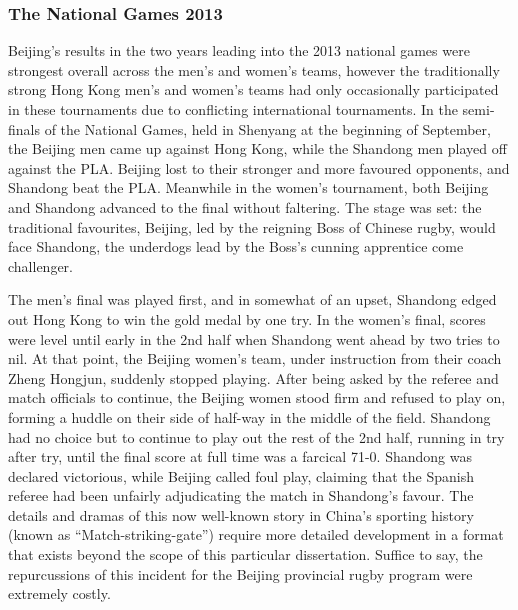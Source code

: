 {\subsubsection{The National Games 2013}
Beijing's results in the two years leading into the 2013 national games were strongest overall across the men's and women's teams, however the traditionally strong Hong Kong men's and women's teams had only occasionally participated in these tournaments due to conflicting international tournaments.  In the semi-finals of the National Games, held in Shenyang at the beginning of September, the Beijing men came up against Hong Kong, while the Shandong men played off against the PLA.  Beijing lost to their stronger and more favoured opponents, and Shandong beat the PLA.  Meanwhile in the women's tournament, both Beijing and Shandong advanced to the final without faltering.  The stage was set: the traditional favourites, Beijing, led by the reigning Boss of Chinese rugby, would face Shandong, the underdogs lead by the Boss's cunning apprentice come challenger.

The men's final was played first, and in somewhat of an upset, Shandong edged out Hong Kong to win the gold medal by one try.  In the women's final, scores were level until early in the 2nd half when Shandong went ahead by two tries to nil.  At that point, the Beijing women's team, under instruction from their coach Zheng Hongjun, suddenly stopped playing.  After being asked by the referee and match officials to continue, the Beijing women stood firm and refused to play on, forming a huddle on their side of half-way in the middle of the field. Shandong had no choice but to continue to play out the rest of the 2nd half, running in try after try, until the final score at full time was a farcical 71-0.  Shandong was declared victorious, while Beijing called foul play, claiming that the Spanish referee had been unfairly adjudicating the match in Shandong's favour.  The details and dramas of this now well-known story in China's sporting history (known as ``Match-striking-gate'') require more detailed development in a format that exists beyond the scope of this particular dissertation. Suffice to say, the repurcussions of this incident for the Beijing provincial rugby program were extremely costly.




}
